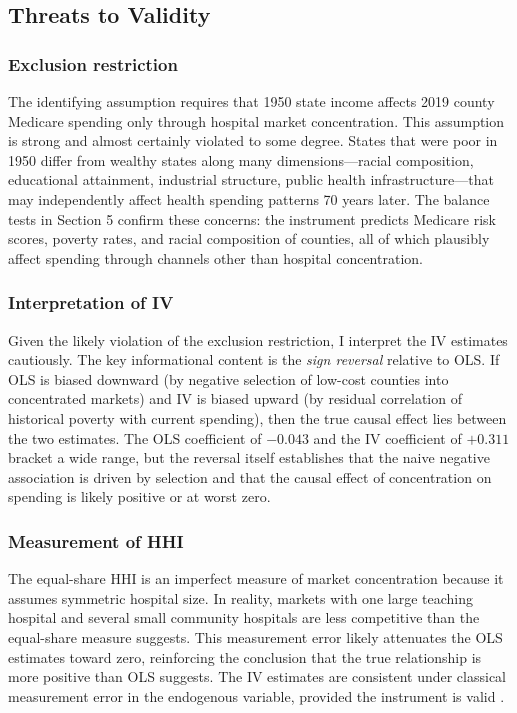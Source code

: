 \documentclass[12pt]{article}
\begin{document}
\subsection{Threats to Validity}

\subsubsection*{Exclusion restriction} The identifying assumption requires that 1950 state income affects 2019 county Medicare spending only through hospital market concentration. This assumption is strong and almost certainly violated to some degree. States that were poor in 1950 differ from wealthy states along many dimensions---racial composition, educational attainment, industrial structure, public health infrastructure---that may independently affect health spending patterns 70 years later. The balance tests in Section 5 confirm these concerns: the instrument predicts Medicare risk scores, poverty rates, and racial composition of counties, all of which plausibly affect spending through channels other than hospital concentration.

\subsubsection*{Interpretation of IV} Given the likely violation of the exclusion restriction, I interpret the IV estimates cautiously. The key informational content is the \emph{sign reversal} relative to OLS. If OLS is biased downward (by negative selection of low-cost counties into concentrated markets) and IV is biased upward (by residual correlation of historical poverty with current spending), then the true causal effect lies between the two estimates. The OLS coefficient of $-0.043$ and the IV coefficient of $+0.311$ bracket a wide range, but the reversal itself establishes that the naive negative association is driven by selection and that the causal effect of concentration on spending is likely positive or at worst zero.

\subsubsection*{Measurement of HHI} The equal-share HHI is an imperfect measure of market concentration because it assumes symmetric hospital size. In reality, markets with one large teaching hospital and several small community hospitals are less competitive than the equal-share measure suggests. This measurement error likely attenuates the OLS estimates toward zero, reinforcing the conclusion that the true relationship is more positive than OLS suggests. The IV estimates are consistent under classical measurement error in the endogenous variable, provided the instrument is valid \citep{angrist2009mostly}.
\end{document}
